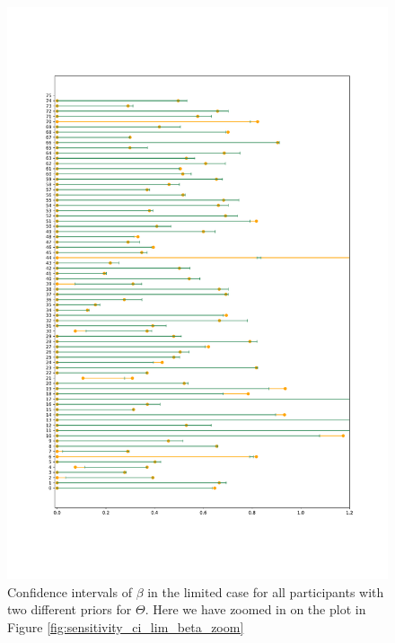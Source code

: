 \begin{figure}
    \centering
    \includegraphics[scale=0.37]{pictures/Sensitivity/ci_lim_beta_zoom2_pdf.pdf}
    \caption[CIs for $\beta$ in the limited case]{Confidence intervals of $\beta$ in the limited case for all participants with two different priors for $\Theta$. Here we have zoomed in on the plot in Figure \ref{fig:sensitivity_ci_lim_beta_zoom}}
    \label{fig:sensitivity_ci_lim_beta_zoom2}
\end{figure}
